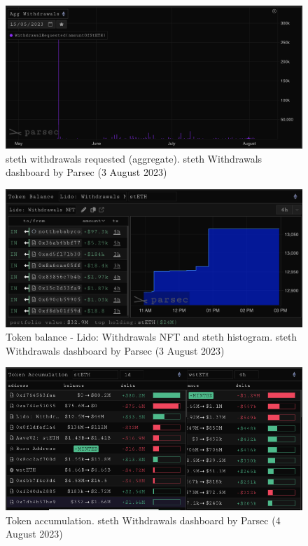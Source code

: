 \documentclass[UTF8]{article}
\begin{document}
{\begin{figure}[htbp]
\begin{center}
\includegraphics[width=\linewidth]{images/parsec4}
\caption{\gls{steth} withdrawals requested (aggregate). \gls{steth} Withdrawals dashboard by Parsec (3 August 2023)}
\label{fig:parsec4}
\end{center}
\end{figure}

\begin{figure}[htbp]
\begin{center}
\includegraphics[width=\linewidth]{images/parsec5}
\caption{Token balance - Lido: Withdrawals NFT and \gls{steth} histogram. \gls{steth} Withdrawals dashboard by Parsec (3 August 2023)}
\label{fig:parsec5}
\end{center}
\end{figure}

\begin{figure}[htbp]
\begin{center}
\includegraphics[width=\linewidth]{images/parsec6}
\caption{Token accumulation. \gls{steth} Withdrawals dashboard by Parsec (4 August 2023)}
\label{fig:parsec6}
\end{center}
\end{figure}


}
\end{document}
